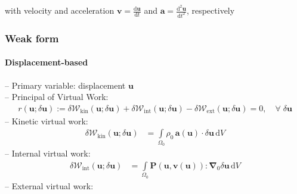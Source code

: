 \documentclass[a4paper,12pt]{report}
\newcommand{\bs}[1]{\boldsymbol{#1}}
\newcommand{\Om}{\mathit{\Omega}}
\begin{document}
with velocity and acceleration $\bs{v}=\frac{\mathrm{d}\bs{u}}{\mathrm{d}t}$ and $\bs{a}=\frac{\mathrm{d}^2\bs{u}}{\mathrm{d}t^2}$, respectively

\subsubsection{Weak form}

\paragraph{Displacement-based}
-- Primary variable: displacement $\bs{u}$\\

-- Principal of Virtual Work:
\begin{align}
r(\bs{u};\delta\bs{u}) := \delta \mathcal{W}_{\mathrm{kin}}(\bs{u};\delta\bs{u}) + \delta \mathcal{W}_{\mathrm{int}}(\bs{u};\delta\bs{u}) - \delta \mathcal{W}_{\mathrm{ext}}(\bs{u};\delta\bs{u}) = 0, \quad \forall \; \delta\bs{u}\label{eq:res_u_solid}
\end{align}
-- Kinetic virtual work:
\begin{align}
\delta \mathcal{W}_{\mathrm{kin}}(\bs{u};\delta\bs{u}) &= \int\limits_{\Om_{0}} \rho_{0}\,\bs{a}(\bs{u}) \cdot \delta\bs{u} \,\mathrm{d}V \label{eq:deltaWkin}
\end{align}
-- Internal virtual work:
\begin{align}
\delta \mathcal{W}_{\mathrm{int}}(\bs{u};\delta\bs{u}) &= \int\limits_{\Om_{0}} \bs{P}(\bs{u},\bs{v}(\bs{u})) : \bs{\nabla}_{0} \delta\bs{u} \,\mathrm{d}V \label{eq:deltaWint}
\end{align}
-- External virtual work:\\
\end{document}
